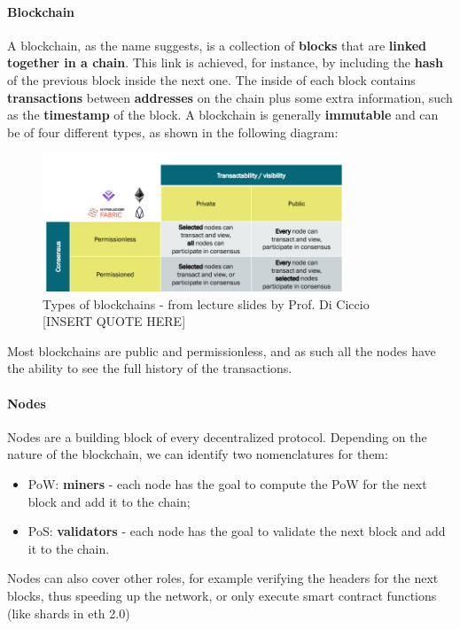 \documentclass[12pt,a4paper,oneside]{article}
\theoremstyle{definition}
\begin{document}
\paragraph{Blockchain} A blockchain, as the name suggests, is a collection of \textbf{blocks} that are \textbf{linked together in a chain}. This link is achieved, for instance, by including the \textbf{hash} of the previous block inside the next one. The inside of each block contains \textbf{transactions} between \textbf{addresses} on the chain plus some extra information, such as the \textbf{timestamp} of the block. A blockchain is generally \textbf{immutable} and can be of four different types, as shown in the following diagram:
\begin{figure}[H]
	\centering
	\includegraphics[width=0.8\textwidth]{figures/bt_types.png}
	\caption{Types of blockchains - from lecture slides by Prof. Di Ciccio [INSERT QUOTE HERE]}
	\label{fig:blockchain_types}
\end{figure}
Most blockchains are public and permissionless, and as such all the nodes have the ability to see the full history of the transactions.


\paragraph{Nodes} Nodes are a building block of every decentralized protocol. Depending on the nature of the blockchain, we can identify two nomenclatures for them:
\begin{itemize}
	\item PoW: \textbf{miners} - each node has the goal to compute the PoW for the next block and add it to the chain;
	\item PoS: \textbf{validators} - each node has the goal to validate the next block and add it to the chain.
\end{itemize}
Nodes can also cover other roles, for example verifying the headers for the next blocks, thus speeding up the network, or only execute smart contract functions (like shards in eth 2.0) \\
\end{document}
